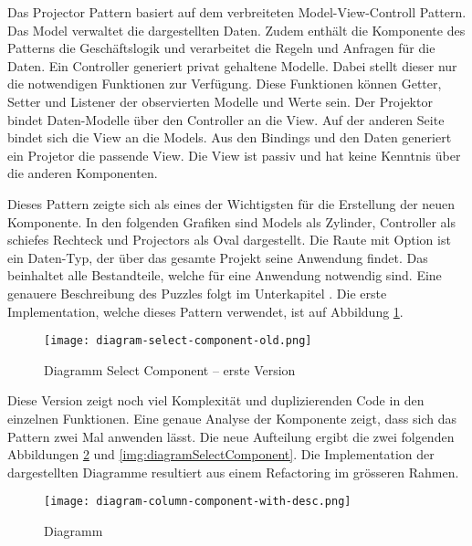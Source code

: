 Das Projector Pattern basiert auf dem verbreiteten Model-View-Controll Pattern. 
Das Model verwaltet die dargestellten Daten. 
Zudem enthält die Komponente des Patterns die Geschäftslogik und verarbeitet die Regeln und Anfragen für die Daten. 
Ein Controller generiert privat gehaltene Modelle. 
Dabei stellt dieser nur die notwendigen Funktionen zur Verfügung. 
Diese Funktionen können Getter, Setter und Listener der observierten Modelle und Werte sein. 
Der Projektor bindet Daten-Modelle über den Controller an die View. 
Auf der anderen Seite bindet sich die View an die Models. 
Aus den Bindings und den Daten generiert ein Projetor die passende View. 
Die View ist passiv und hat keine Kenntnis über die anderen Komponenten. 

Dieses Pattern zeigte sich als eines der Wichtigsten für die Erstellung der neuen Komponente. 
In den folgenden Grafiken sind Models als Zylinder, Controller als schiefes Rechteck und Projectors als Oval dargestellt. 
Die Raute mit Option ist ein Daten-Typ, der über das gesamte Projekt seine Anwendung findet. 
Das  beinhaltet alle Bestandteile, welche für eine Anwendung notwendig sind. 
Eine genauere Beschreibung des Puzzles folgt im Unterkapitel \textbf{}. 
Die erste Implementation, welche dieses Pattern verwendet, ist auf Abbildung \ref{img:diagramSelectComponentOld}. 

\begin{figure}[!htb]
    \centering
    \texttt{[image: diagram-select-component-old.png]}
    \caption{\centering Diagramm Select Component – erste Version}
    \label{img:diagramSelectComponentOld}
\end{figure}

Diese Version zeigt noch viel Komplexität und duplizierenden Code in den einzelnen Funktionen. 
Eine genaue Analyse der Komponente zeigt, dass sich das Pattern zwei Mal anwenden lässt. 
Die neue Aufteilung ergibt die zwei folgenden Abbildungen \ref{img:diagramColumnComponent} und \ref{img:diagramSelectComponent}. 
Die Implementation der dargestellten Diagramme resultiert aus einem Refactoring im grösseren Rahmen. 

\begin{figure}[!htb]
    \centering
    \texttt{[image: diagram-column-component-with-desc.png]}
    \caption{\centering Diagramm }
    \label{img:diagramColumnComponent}
\end{figure}


